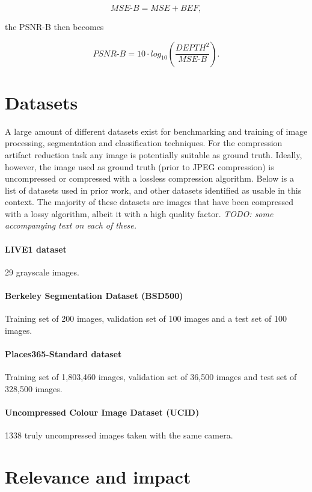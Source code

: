 $$
\textit{MSE-B} = \textit{MSE} + \textit{BEF},
$$

the PSNR-B then becomes

$$
\textit{PSNR-B} = 10 \cdot \textit{log}_{10}(\frac{\textit{DEPTH}^2}{\textit{MSE-B}}).
$$

\section{Datasets}
A large amount of different datasets exist for benchmarking and training of image processing, segmentation and classification techniques. For the compression artifact reduction task any image is potentially suitable as ground truth. Ideally, however, the image used as ground truth (prior to JPEG compression) is uncompressed or compressed with a lossless compression algorithm. Below is a list of datasets used in prior work, and other datasets identified as usable in this context. The majority of these datasets are images that have been compressed with a lossy algorithm, albeit it with a high quality factor. \textit{TODO: some accompanying text on each of these.}

\paragraph{LIVE1 dataset \cite{liveDatabase}} 29 grayscale images.

\paragraph{Berkeley Segmentation Dataset (BSD500) \cite{bsd500}} Training set of 200 images, validation set of 100 images and a test set of 100 images. 

\paragraph{Places365-Standard dataset \cite{places2}} Training set of 1,803,460 images, validation set of 36,500 images and test set of 328,500 images.

\paragraph{Uncompressed Colour Image Dataset (UCID) \cite{ucid}} 1338 truly uncompressed images taken with the same camera.

\section{Relevance and impact}{}

